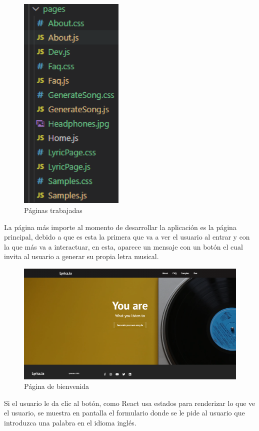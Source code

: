 \documentclass[12pt, a4paper, titlepage]{report}
\begin{document}
\begin{figure}[H]
	\includegraphics[width=5cm]{./imagenes/Desarrollo/AplicacionWeb/Paginas.png}
	\centering 
	\caption{Páginas trabajadas}
\end{figure}
La página más importe al momento de desarrollar la aplicación es la página principal, debido a que es esta la primera que va a ver el usuario al entrar y con la que más va a interactuar, en esta, aparece un mensaje con un botón el cual invita al usuario a generar su propia letra musical.
\begin{figure}[H]
	\includegraphics[width=13.5cm]{./imagenes/Desarrollo/AplicacionWeb/Pbienvenida.png}
	\centering 
	\caption{Página de bienvenida}
\end{figure}
Si el usuario le da clic al botón, como React usa estados para renderizar lo que ve el usuario, se muestra en pantalla el formulario donde se le pide al usuario que introduzca una palabra en el idioma inglés.
\end{document}
